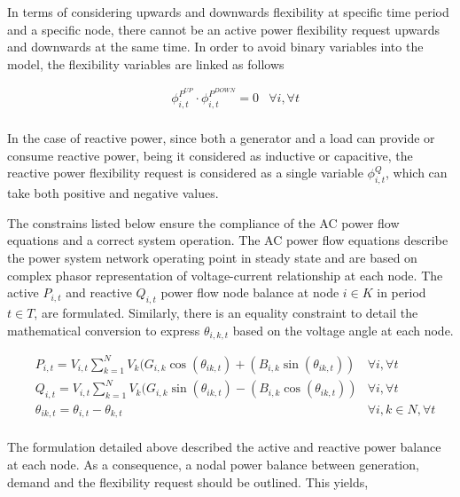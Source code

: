 In terms of considering upwards and downwards flexibility at specific time period and a specific node, there cannot be an active power flexibility request upwards and downwards at the same time. In order to avoid binary variables into the model, the flexibility variables are linked as follows

\begin{subequations}
\begin{align*}
& \phi_{i,t}^{P^{UP}} \cdot \phi_{i,t}^{P^{DOWN}} = 0 & \forall i,\forall t \\
\end{align*}
\end{subequations}

In the case of reactive power, since both a generator and a load can provide or consume reactive power, being it considered as inductive or capacitive, the reactive power flexibility request is considered as a single variable $\phi_{i,t}^{Q}$, which can take both positive and negative values. 


The constrains listed below ensure the compliance of the AC power flow equations and a correct system operation. The AC power flow equations describe the power system network operating point in steady state and are based on complex phasor representation of voltage-current relationship at each node. The active $P_{i,t}$ and reactive $Q_{i,t}$ power flow node balance at node $i \in K$ in period  $t \in T$, are formulated. Similarly, there is an equality constraint to detail the mathematical conversion to express  $\theta_{i,k,t}$ based on the voltage angle at each node.

\begin{subequations}
\begin{align*}
& P_{i,t} = V_{i,t} \sum_{k=1}^{N} V_{k} (G_{i,k} \cos(\theta_{ik,t}) + (B_{i,k} \sin(\theta_{ik,t})) & \forall i,\forall t  \\ 
& Q_{i,t} = V_{i,t} \sum_{k=1}^{N} V_{k} (G_{i,k} \sin(\theta_{ik,t}) - (B_{i,k} \cos(\theta_{ik,t})) & \forall i,\forall t \\
& \theta_{ik,t} = \theta_{i,t} - \theta_{k,t} 															& \forall i,k \in N, \forall t \\
\end{align*}
\end{subequations}

The formulation detailed above described the active and reactive power balance at each node. As a consequence, a nodal power balance between generation, demand and the flexibility request should be outlined. This yields, 

